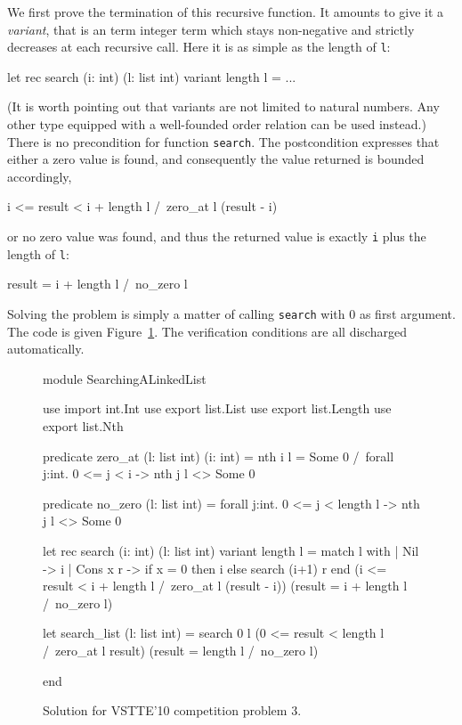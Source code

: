 We first prove the termination of this recursive function. It amounts
to give it a \emph{variant}, that is an term integer term which stays
non-negative and strictly decreases at each recursive call. Here it is
as simple as the length of \texttt{l}:
\begin{whycode}
  let rec search (i: int) (l: list int) variant { length l } = ...
\end{whycode}
(It is worth pointing out that variants are not limited to natural
numbers. Any other type equipped with a well-founded order relation
can be used instead.)
There is no precondition for function \texttt{search}.
The postcondition expresses that either a zero value is found, and
consequently the value returned is bounded accordingly,
\begin{whycode}
  i <= result < i + length l /\ zero_at l (result - i)
\end{whycode}
or no zero value was found, and thus the returned value is exactly
\texttt{i} plus the length of \texttt{l}:
\begin{whycode}
  result = i + length l /\ no_zero l
\end{whycode}
Solving the problem is simply a matter of calling \texttt{search} with
0 as first argument.
The code is given Figure~\ref{fig:LinkedList}. The verification
conditions are all discharged automatically.
\begin{figure}
  \centering
\begin{whycode}
module SearchingALinkedList

  use import int.Int
  use export list.List
  use export list.Length
  use export list.Nth

  predicate zero_at (l: list int) (i: int) =
    nth i l = Some 0 /\ forall j:int. 0 <= j < i -> nth j l <> Some 0

  predicate no_zero (l: list int) =
    forall j:int. 0 <= j < length l -> nth j l <> Some 0

  let rec search (i: int) (l: list int) variant { length l } =
    {}
    match l with
    | Nil -> i
    | Cons x r -> if x = 0 then i else search (i+1) r
    end
    { (i <= result < i + length l /\ zero_at l (result - i))
      \/
      (result = i + length l /\ no_zero l) }

  let search_list (l: list int) =
    { }
    search 0 l
    { (0 <= result < length l /\ zero_at l result)
      \/
      (result = length l /\ no_zero l) }

end
\end{whycode}
\vspace*{-2em}\hrulefill
  \caption{Solution for VSTTE'10 competition problem 3.}
  \label{fig:LinkedList}
\end{figure}

